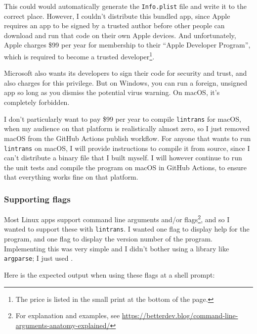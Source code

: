 \documentclass[../development.tex]{subfiles}
\begin{document}

This could would automatically generate the \texttt{Info.plist} file and write it to the correct place. However, I couldn't distribute this bundled app, since Apple requires an app to be signed by a trusted author before other people can download and run that code on their own Apple devices\cite{apple-about-code-signing}. And unfortunately, Apple charges \$99 per year for membership to their \enquote{Apple Developer Program}, which is required to become a trusted developer\cite{apple-developer-program-enrollment}\footnote{The price is listed in the small print at the bottom of the page.}.

Microsoft also wants its developers to sign their code for security and trust, and also charges for this privilege. But on Windows, you can run a foreign, unsigned app so long as you dismiss the potential virus warning. On macOS, it's completely forbidden.

I don't particularly want to pay \$99 per year to compile \texttt{lintrans} for macOS, when my audience on that platform is realistically almost zero, so I just removed macOS from the GitHub Actions publish workflow. For anyone that wants to run \texttt{lintrans} on macOS, I will provide instructions to compile it from source, since I can't distribute a binary file that I built myself. I will however continue to run the unit tests and compile the program on macOS in GitHub Actions, to ensure that everything works fine on that platform.

\subsubsection{Supporting flags\label{development:preparing-for-v0.2.1:supporting-flags}}

Most Linux apps support command line arguments and/or flags\footnote{For explanation and examples, see \url{https://betterdev.blog/command-line-arguments-anatomy-explained/}}, and so I wanted to support these with \texttt{lintrans}. I wanted one flag to display help for the program, and one flag to display the version number of the program. Implementing this was very simple and I didn't bother using a library like \texttt{argparse}; I just used .


Here is the expected output when using these flags at a shell prompt:
\end{document}
